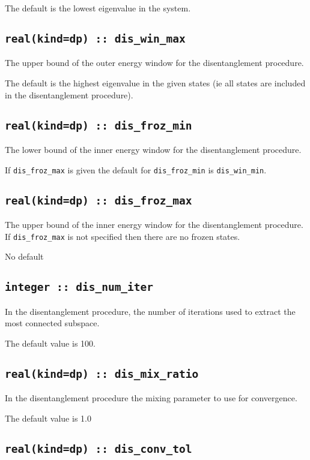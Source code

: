 The default is the lowest eigenvalue in the system.

\subsection[dis\_win\_max]{\tt real(kind=dp) :: dis\_win\_max}
The upper bound of the outer energy window for the disentanglement
procedure.

The default is the highest eigenvalue in the given states (ie all states
are included in the disentanglement procedure).

\subsection[dis\_froz\_min]{\tt real(kind=dp) :: dis\_froz\_min}
The lower bound of the inner energy window for the disentanglement
procedure. 

If \verb#dis_froz_max# is given the default for 
\verb#dis_froz_min# is \verb#dis_win_min#.


\subsection[dis\_froz\_max]{\tt real(kind=dp) :: dis\_froz\_max}
The upper bound of the inner energy window for the disentanglement
procedure. If \verb#dis_froz_max# is  not specified then 
there are no frozen states.

No default

\subsection[dis\_num\_iter]{\tt integer :: dis\_num\_iter}
In the disentanglement procedure, the
number of iterations used to extract the most connected subspace.

The default value is 100.

\subsection[dis\_mix\_ratio]{\tt real(kind=dp) :: dis\_mix\_ratio}
In the disentanglement procedure the mixing parameter to use for
convergence.

The default value is 1.0

\subsection[dis\_conv\_tol]{\tt real(kind=dp) :: dis\_conv\_tol}


